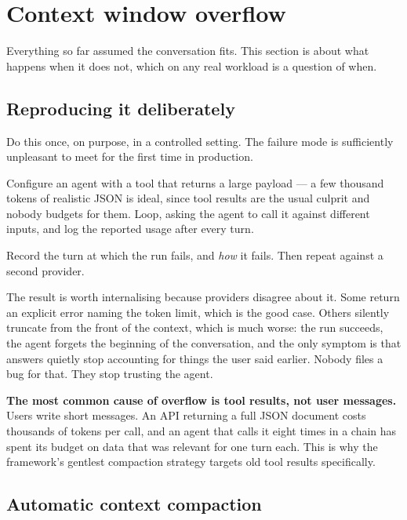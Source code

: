\section{Context window overflow}
\label{sec:overflow}

Everything so far assumed the conversation fits. This section is about what
happens when it does not, which on any real workload is a question of when.

\subsection{Reproducing it deliberately}

Do this once, on purpose, in a controlled setting. The failure mode is
sufficiently unpleasant to meet for the first time in production.

\begin{exercisebox}
Configure an agent with a tool that returns a large payload --- a few thousand
tokens of realistic JSON is ideal, since tool results are the usual culprit and
nobody budgets for them. Loop, asking the agent to call it against different
inputs, and log the reported usage after every turn.

Record the turn at which the run fails, and \emph{how} it fails. Then repeat
against a second provider.
\end{exercisebox}

The result is worth internalising because providers disagree about it. Some
return an explicit error naming the token limit, which is the good case. Others
silently truncate from the front of the context, which is much worse: the run
succeeds, the agent forgets the beginning of the conversation, and the only
symptom is that answers quietly stop accounting for things the user said earlier.
Nobody files a bug for that. They stop trusting the agent.

\begin{warning}
\textbf{The most common cause of overflow is tool results, not user messages.}
Users write short messages. An API returning a full JSON document costs thousands
of tokens per call, and an agent that calls it eight times in a chain has spent
its budget on data that was relevant for one turn each. This is why the
framework's gentlest compaction strategy targets old tool results specifically.
\end{warning}

\subsection{Automatic context compaction}
\label{sec:compaction}

